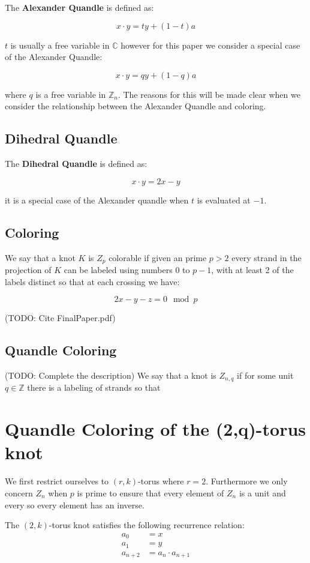 \documentclass[12pt]{article}
\begin{document}
The \textbf{Alexander Quandle} is defined as:

$$ x \cdot y = ty + (1 - t)a $$

$t$ is usually a free variable in $\mathbb{C}$ however for this paper we consider a special case of the Alexander Quandle:

$$ x \cdot y = qy + (1 - q)a $$

where $q$ is a free variable in $\mathbb{Z}_n$. The reasons for this will be made clear when we consider the relationship between the Alexander Quandle and coloring.

\subsection{Dihedral Quandle}
The \textbf{Dihedral Quandle} is defined as:

$$x\cdot y = 2x - y$$

it is a special case of the Alexander quandle when $t$ is evaluated at $-1$.

\subsection{Coloring}

We say that a knot $K$ is $Z_p$ colorable if given an prime $p > 2$ every strand in the projection of $K$ can be labeled using numbers $0$ to $p-1$, with at least 2 of the labels distinct so that at each crossing we have:

$$ 2x - y - z = 0 \mod p $$

(TODO: Cite FinalPaper.pdf)

\subsection{Quandle Coloring}

(TODO: Complete the description)
We say that a knot is $Z_{n,q}$ if for some unit $q \in \mathbb{Z}$ there is a labeling of strands so that

\section{Quandle Coloring of the (2,q)-torus knot}\label{2qtorus}
We first restrict ourselves to $(r,k)$-torus where $r = 2$. Furthermore we only concern $Z_n$ when $p$ is prime to ensure that every element of $Z_n$ is a unit and every so every element has an inverse.

The $(2,k)$-torus knot satisfies the following recurrence relation:
\begin{align*}
	a_0 &= x \\
	a_1 &= y \\
	a_{n+2} &= a_{n} \cdot a_{n+1} \\
\end{align*}
\end{document}
